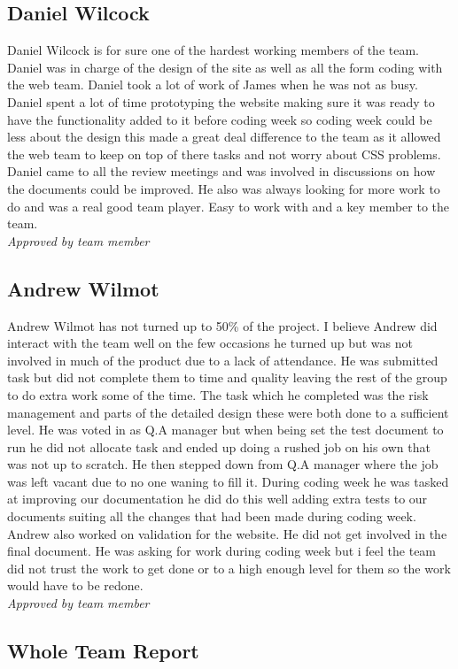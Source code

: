 \subsection{Daniel Wilcock}
    Daniel Wilcock is for sure one of the hardest working members of the team. Daniel was in charge of the design of the site as well as all the form coding with the web team. Daniel took a lot of work of James when he was not as busy. Daniel spent a lot of time prototyping the website making sure it was ready to have the functionality added to it before coding week so coding week could be less about the design this made a great deal difference to the team as it allowed the web team to keep on top of there tasks and not worry about CSS problems.
    Daniel came to all the review meetings and was involved in discussions on how the documents could be improved. He also was always looking for more work to do and was a real good team player. Easy to work with and a key member to the team.\\
    \emph{Approved by team member}

\subsection{Andrew Wilmot}
    Andrew Wilmot has not turned up to 50\% of the project. I believe Andrew did interact with the team well on the few occasions he turned up but was not involved in much of the product due to a lack of attendance. He was submitted task but did not complete them to time and quality leaving the rest of the group to do extra work some of the time. The task which he completed was the risk management and parts of the detailed design these were both done to a sufficient level.  He was voted in as Q.A manager but when being set the test document to run he did not allocate task and ended up doing a rushed job on his own that was not up to scratch. He then stepped down from Q.A manager where the job was left vacant due to no one waning to fill it. During coding week he was tasked at improving our documentation he did do this well adding extra tests to our documents suiting all the changes that had been made during coding week. Andrew also worked on validation for the website. He did not get involved in the final document. He was asking for work during coding week but i feel the team did not trust the work to get done or to a high enough level for them so the work would have to be redone.\\
    \emph{Approved by team member}

\subsection{Whole Team Report}
    
